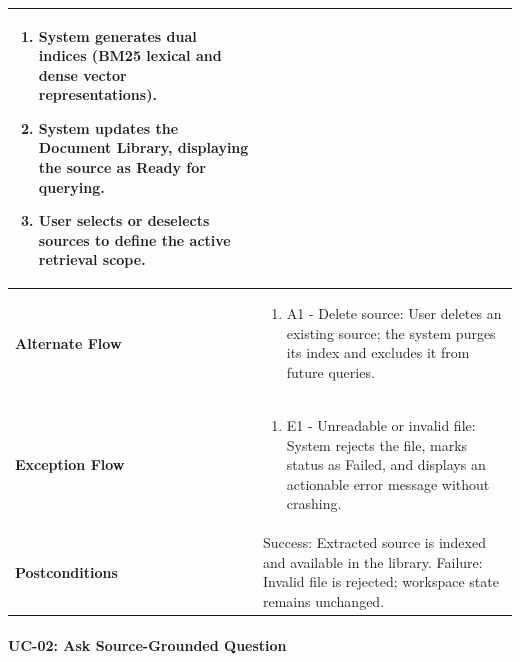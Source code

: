 \begin{longtable}{>{\raggedright\arraybackslash}p{}>{\raggedright\arraybackslash}p{}}
\begin{enumerate}[nosep,leftmargin=*,label=\arabic*.]
    \item System generates dual indices (BM25 lexical and dense vector representations).

    \item System updates the Document Library, displaying the source as Ready for querying.

    \item User selects or deselects sources to define the active retrieval scope.

\end{enumerate} \\ \hline

\textbf{Alternate Flow} & \begin{enumerate}[nosep,leftmargin=*,label=\arabic*.]

    \item A1 - Delete source: User deletes an existing source; the system purges its index and excludes it from future queries.

\end{enumerate} \\ \hline

\textbf{Exception Flow} & \begin{enumerate}[nosep,leftmargin=*,label=\arabic*.]

    \item E1 - Unreadable or invalid file: System rejects the file, marks status as Failed, and displays an actionable error message without crashing.

\end{enumerate} \\ \hline

\textbf{Postconditions} & Success: Extracted source is indexed and available in the library. Failure: Invalid file is rejected; workspace state remains unchanged. \\ \hline

\end{longtable}

\endgroup





\paragraph*{UC-02: Ask Source-Grounded Question}

\begingroup

\small

